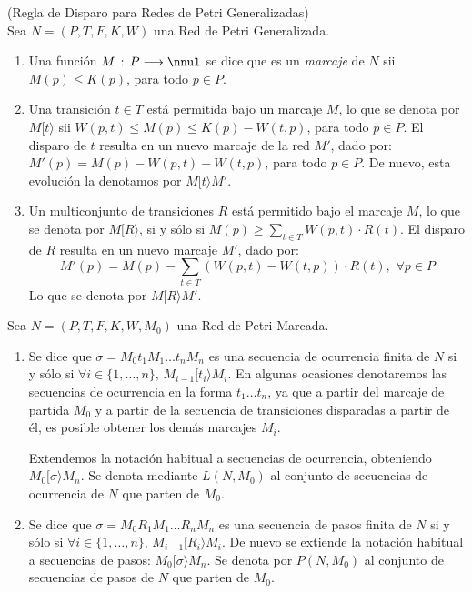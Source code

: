 \begin{definition} (Regla de Disparo para Redes de Petri Generalizadas)\\
Sea $N=(P,T,F,K,W)$ una Red de Petri Generalizada.
\begin{enumerate}
\item Una funci\'{o}n $M\,:\, P \longrightarrow \nnul$ se dice que
es un {\it marcaje} de $N$ sii $M(p) \leq K(p)$, para todo
$p \in P$.
\item Una transici\'{o}n $t \in T$ est\'{a} permitida bajo un marcaje
$M$, lo que se denota por $M[ t \rangle$
sii $W(p,t) \leq M(p) \leq K(p) - W(t,p)$, para todo $p \in P$.
El disparo de $t$ resulta en un nuevo marcaje de la red $M'$, dado por:
$M'(p) = M(p) - W(p,t) + W(t,p)$, para todo $p \in P$.
De nuevo, esta evoluci\'{o}n la denotamos por $M[ t \rangle M'$.
\item Un multiconjunto de transiciones $R$ est\'{a} permitido bajo el
marcaje $M$, lo que se denota por $M [ R \rangle$, si y s\'{o}lo si
$M(p) \geq \sum_{t \in T} W(p,t) \cdot R(t)$. El disparo de $R$
resulta en un nuevo marcaje $M'$, dado por:
\[ M'(p) = M(p) - \sum_{t \in T} (W(p,t) - W(t,p)) \cdot R(t), \,\,
\forall p \in P\]
Lo que se denota por $M [ R \rangle M'$.
\end{enumerate}
\end{definition}

\begin{definition} Sea $N=(P,T,F,K,W,M_0)$ una Red de Petri Marcada.
\begin{enumerate}
\item Se dice que $\sigma = M_0 t_1 M_1 \ldots t_n M_n$ es una
secuencia de ocurrencia finita de $N$ si y s\'{o}lo si
$\forall i \in \{1,\ldots,n\},\,M_{i-1} [ t_i \rangle M_i$.
En algunas ocasiones denotaremos las secuencias de ocurrencia
en la forma $t_1 \ldots t_n$, ya que a partir del marcaje de partida
$M_0$ y a partir de la secuencia de transiciones disparadas a partir de \'{e}l,
es posible obtener los dem\'{a}s marcajes $M_i$.

Extendemos la notaci\'{o}n habitual a
secuencias de ocurrencia, obteniendo $M_0 [ \sigma \rangle M_n$.
Se denota mediante $L(N,M_0)$ al
conjunto de secuencias de ocu\-rren\-cia de $N$ que parten de $M_0$.
\item Se dice que $\sigma = M_0 R_1 M_1 \ldots R_n M_n$ es una
secuencia de pasos finita de $N$ si y s\'{o}lo si
$\forall i \in \{1,\ldots,n\},\,M_{i-1} [ R_i \rangle M_i$.
De nuevo se extiende la notaci\'{o}n habitual a secuencias de pasos:
$M_0 [ \sigma \rangle M_n$.
Se denota por $P(N,M_0)$ al conjunto de secuencias de pasos de $N$
que parten de $M_0$.
\end{enumerate}
\end{definition}

